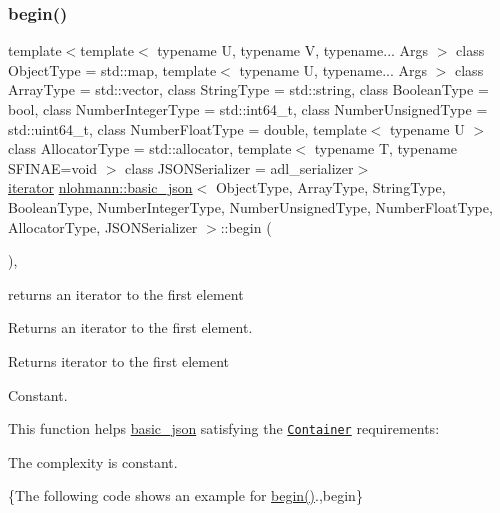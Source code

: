 \subsubsection{\texorpdfstring{begin()}{begin()}\hspace{0.1cm}{\footnotesize\ttfamily [1/2]}}
{\footnotesize\ttfamily template$<$template$<$ typename U, typename V, typename... Args $>$ class Object\+Type = std\+::map, template$<$ typename U, typename... Args $>$ class Array\+Type = std\+::vector, class String\+Type  = std\+::string, class Boolean\+Type  = bool, class Number\+Integer\+Type  = std\+::int64\+\_\+t, class Number\+Unsigned\+Type  = std\+::uint64\+\_\+t, class Number\+Float\+Type  = double, template$<$ typename U $>$ class Allocator\+Type = std\+::allocator, template$<$ typename T, typename S\+F\+I\+N\+A\+E=void $>$ class J\+S\+O\+N\+Serializer = adl\+\_\+serializer$>$ \\
\mbox{\hyperlink{classnlohmann_1_1basic__json_a099316232c76c034030a38faa6e34dca}{iterator}} \mbox{\hyperlink{classnlohmann_1_1basic__json}{nlohmann\+::basic\+\_\+json}}$<$ Object\+Type, Array\+Type, String\+Type, Boolean\+Type, Number\+Integer\+Type, Number\+Unsigned\+Type, Number\+Float\+Type, Allocator\+Type, J\+S\+O\+N\+Serializer $>$\+::begin (\begin{DoxyParamCaption}{ }\end{DoxyParamCaption})\hspace{0.3cm}{\ttfamily [inline]}, {\ttfamily [noexcept]}}



returns an iterator to the first element 

Returns an iterator to the first element.

 \begin{DoxyReturn}{Returns}
iterator to the first element
\end{DoxyReturn}
Constant.

This function helps {\ttfamily \mbox{\hyperlink{classnlohmann_1_1basic__json}{basic\+\_\+json}}} satisfying the \href{https://en.cppreference.com/w/cpp/named_req/Container}{\tt Container} requirements\+:
\begin{DoxyItemize}
\item The complexity is constant.
\end{DoxyItemize}

\{The following code shows an example for {\ttfamily \mbox{\hyperlink{classnlohmann_1_1basic__json_a0ff28dac23f2bdecee9564d07f51dcdc}{begin()}}}.,begin\}

